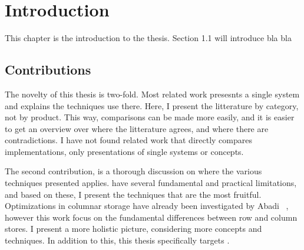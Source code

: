 \chapter{Introduction}
\label{chap:introduction}
This chapter is the introduction to the thesis. Section 1.1 will introduce bla bla
\clearpage



%


\section{Contributions}
\label{sec:Contributions}
The novelty of this thesis is two-fold. Most related work presesnts a single system and explains the techniques use there. Here, I present the litterature by category, not by product. This way, comparisons can be made more easily, and it is easier to get an overview over where the litterature agrees, and where there are contradictions. I have not found related work that directly compares implementations, only presentations of single systems or concepts.

The second contribution, is a thorough discussion on where the various techniques presented applies. \genusSoftware have several fundamental and practical limitations, and based on these, I present the techniques that are the most fruitful. Optimizations in columnar storage have already been investigated by Abadi \ea~\cite{Abadi2008-dd}, however this work focus on the fundamental differences between row and column stores. I present a more holistic picture, considering more concepts and techniques. In addition to this, this thesis specifically targets \genusSoftware.




